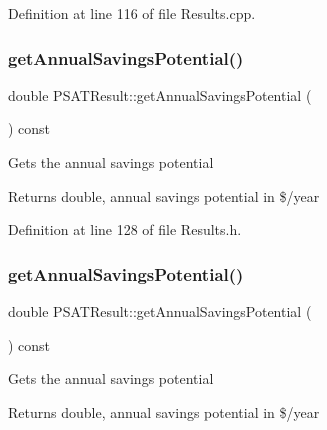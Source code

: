 Definition at line 116 of file Results.\+cpp.

\mbox{\label{class_p_s_a_t_result_a14fc75c2e0e92f74e3df1b97ed13b496}} 
\subsubsection{\texorpdfstring{get\+Annual\+Savings\+Potential()}{getAnnualSavingsPotential()}\hspace{0.1cm}{\footnotesize\ttfamily [1/3]}}
{\footnotesize\ttfamily double P\+S\+A\+T\+Result\+::get\+Annual\+Savings\+Potential (\begin{DoxyParamCaption}{ }\end{DoxyParamCaption}) const\hspace{0.3cm}{\ttfamily [inline]}}

Gets the annual savings potential \begin{DoxyReturn}{Returns}
double, annual savings potential in \$/year 
\end{DoxyReturn}


Definition at line 128 of file Results.\+h.

\mbox{\label{class_p_s_a_t_result_a14fc75c2e0e92f74e3df1b97ed13b496}} 
\subsubsection{\texorpdfstring{get\+Annual\+Savings\+Potential()}{getAnnualSavingsPotential()}\hspace{0.1cm}{\footnotesize\ttfamily [2/3]}}
{\footnotesize\ttfamily double P\+S\+A\+T\+Result\+::get\+Annual\+Savings\+Potential (\begin{DoxyParamCaption}{ }\end{DoxyParamCaption}) const\hspace{0.3cm}{\ttfamily [inline]}}

Gets the annual savings potential \begin{DoxyReturn}{Returns}
double, annual savings potential in \$/year 
\end{DoxyReturn}


